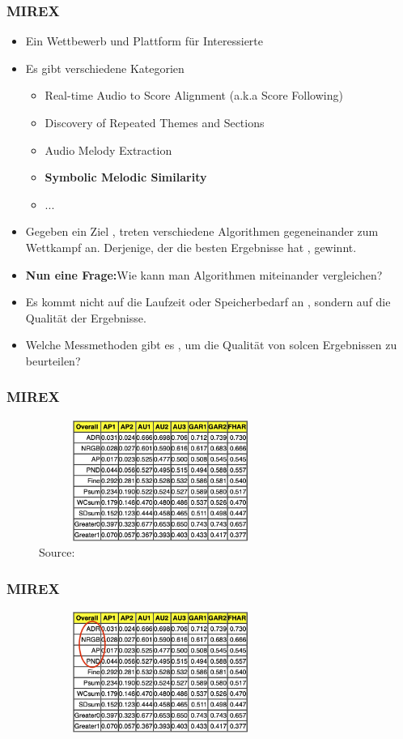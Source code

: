 \documentclass{beamer}
\begin{document}
	\begin{frame}
		\frametitle{MIREX}
		\begin{itemize}
			\item Ein Wettbewerb und Plattform für Interessierte
			\item Es gibt verschiedene Kategorien
				\begin{itemize}
					\item Real-time Audio to Score Alignment (a.k.a Score Following)
					\item Discovery of Repeated Themes and Sections
					\item Audio Melody Extraction
					\item \textbf{Symbolic Melodic Similarity}
					\item ...
				\end{itemize}
			\item Gegeben ein Ziel , treten verschiedene Algorithmen gegeneinander zum Wettkampf an. Derjenige, der die besten Ergebnisse hat , gewinnt. 
			\item \textbf{Nun eine Frage:}Wie kann man Algorithmen miteinander vergleichen?
			\item Es kommt nicht auf die Laufzeit oder Speicherbedarf an , sondern auf die Qualität der Ergebnisse.
			\item Welche Messmethoden gibt es , um die Qualität von solcen Ergebnissen zu beurteilen?
		\end{itemize}
	\end{frame}

	\begin{frame}
		\frametitle{MIREX}
		\begin{figure}[h!]
			\includegraphics[width=300px,height=150px,keepaspectratio]{mirex_result_example}
			\caption{Source: \cite{mirex_website_2007_results}}
		\end{figure}
	\end{frame}


	\begin{frame}
		\frametitle{MIREX}
		\begin{figure}[h!]
			\includegraphics[width=300px,height=150px,keepaspectratio]{mirex_result_example_change_one}
		\end{figure}
	\end{frame}
\end{document}
